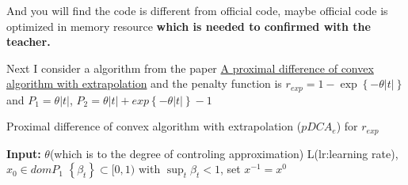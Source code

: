 \documentclass[11pt,en,bibstyle=ieeetr]{elegantpaper}
\begin{document}
And you will find the code is different from official code, maybe official code is optimized in memory resource \textbf{which is needed to confirmed with the teacher.}


Next I consider a algorithm from the paper \href{https://arxiv.org/abs/1612.06265#:~:text=We%20consider%20a%20class%20of,and%20a%20continuous%20concave%20function.}{A proximal difference of convex algorithm with extrapolation} 
and the penalty function is $ r_{exp} = 1-\exp \left\{  -\theta \left| t \right|  \right\} $
and $ P_1 = \theta \left| t \right|  $, $ P_2 = \theta \left| t \right| + exp \left\{-\theta \left| t \right| \right\} -1 $


 \begin{algorithm}[H]
        \caption{Proximal difference of convex algorithm with extrapolation ($ pDCA_e $) for $ r_{exp} $}\label{alg2}
        \begin{algorithmic}[1]
            \newline
			\textbf{Input:}	$ \theta $(which is to the degree of controling approximation)\newline
				L(lr:learning rate),\newline
				$ x_0 \in dom P_1 $ \newline
				$\left\{ \beta_t \right\} \subset [0,1) $ with $ \sup_t \beta_t <1 $,\newline
				set $ x^{-1} = x^0 $
		
			\EndWhile
            \EndProcedure
        \end{algorithmic}
        \label{alg_2}
    \end{algorithm}
\end{document}
